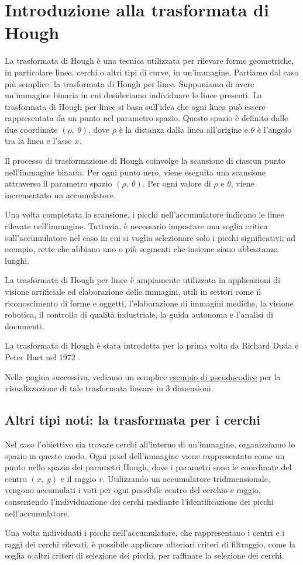 \section{Introduzione alla trasformata di Hough}
La trasformata di Hough è una tecnica utilizzata per rilevare forme geometriche, in particolare linee, cerchi o altri tipi di curve, in un'immagine. Partiamo dal caso più semplice: la trasformata di Hough per linee. Supponiamo di avere un'immagine binaria in cui desideriamo individuare le linee presenti. La trasformata di Hough per linee si basa sull'idea che ogni linea può essere rappresentata da un punto nel parametro spazio. Questo spazio è definito dalle due coordinate $(\rho,\ \theta)$, dove $\rho$ è la distanza dalla linea all'origine e $\theta$ è l'angolo tra la linea e l'asse $x$. \par
Il processo di trasformazione di Hough coinvolge la scansione di ciascun punto nell'immagine binaria. Per ogni punto nero, viene eseguita una scansione attraverso il parametro spazio $(\rho,\ \theta)$. Per ogni valore di $\rho$ e $\theta$, viene incrementato un accumulatore.\par
Una volta completata la scansione, i picchi nell'accumulatore indicano le linee rilevate nell'immagine. Tuttavia, è necessario impostare una soglia critica sull'accumulatore nel caso in cui si voglia selezionare solo i picchi significativi; ad esempio, rette che abbiano uno o più segmenti che insieme siano abbastanza lunghi.\par
La trasformata di Hough per linee è ampiamente utilizzata in applicazioni di visione artificiale ed elaborazione delle immagini, utili in settori come il riconoscimento di forme e oggetti, l'elaborazione di immagini mediche, la visione robotica, il controllo di qualità industriale, la guida autonoma e l'analisi di documenti.\par
La trasformata di Hough è stata introdotta per la prima volta da Richard Duda e Peter Hart nel 1972 \cite{houghtransform}.\par
Nella pagina successiva,  vediamo un semplice \hyperref[lst:houghlineare]{esempio di pseudocodice} per la visualizzazione di tale trasformata lineare in 3 dimensioni.

\subsection{Altri tipi noti: la trasformata per i cerchi}
Nel caso l'obiettivo sia trovare cerchi all'interno di un'immagine, organizziamo lo spazio in questo modo. Ogni pixel dell'immagine viene rappresentato come un punto nello spazio dei parametri Hough, dove i parametri sono le coordinate del centro $(x,\ y)$ e il raggio $r$. Utilizzando un accumulatore tridimensionale, vengono accumulati i voti per ogni possibile centro del cerchio e raggio, consentendo l'individuazione dei cerchi mediante l'identificazione dei picchi nell'accumulatore. \par
Una volta individuati i picchi nell'accumulatore, che rappresentano i centri e i raggi dei cerchi rilevati, è possibile applicare ulteriori criteri di filtraggio, come la soglia o altri criteri di selezione dei picchi, per raffinare la selezione dei cerchi.


